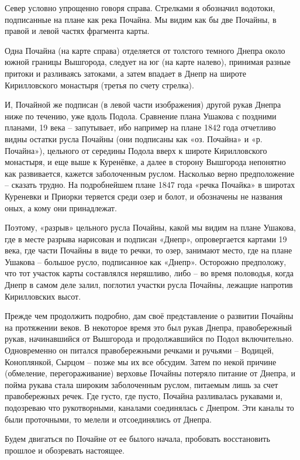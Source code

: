 Север условно упрощенно говоря справа. Стрелками я обозначил водотоки, подписанные на плане как река Почайна. Мы видим как бы две Почайны, в правой и левой частях фрагмента карты.

Одна Почайна (на карте справа) отделяется от толстого темного Днепра около южной границы Вышгорода, следует на юг (на карте налево), принимая разные притоки и разливаясь затоками, а затем впадает в Днепр на широте Кирилловского монастыря (третья по счету стрелка). 

И, Почайной же подписан (в левой части изображения) другой рукав Днепра ниже по течению, уже вдоль Подола. Сравнение плана Ушакова с поздними планами, 19 века – запутывает, ибо например на плане 1842 года отчетливо видны остатки русла Почайны (они подписаны как «оз. Почайна» и «р. Почайна»), цельного от середины Подола вверх к широте Кирилловского монастыря, и еще выше к Куренёвке, а далее в сторону Вышгорода непонятно как развивается, кажется заболоченным руслом. Насколько верно предположение – сказать трудно. На подробнейшем плане 1847 года «речка Почайка» в широтах Куреневки и Приорки теряется среди озер и болот, и обозначены не названия оных, а кому они принадлежат.

Поэтому, «разрыв» цельного русла Почайны, какой мы видим на плане Ушакова, где в месте разрыва нарисован и подписан «Днепр», опровергается картами 19 века, где части Почайны в виде то речки, то озер, занимают место, где на плане Ушакова – большое русло, подписанное как «Днепр». Осторожно предположу, что тот участок карты составлялся неряшливо, либо – во время половодья, когда Днепр в самом деле залил, поглотил участки русла Почайны, лежащие напротив Кирилловских высот.

Прежде чем продолжить подробно, дам своё представление о развитии Почайны на протяжении веков. В некоторое время это был рукав Днепра, правобережный рукав, начинавшийся от Вышгорода и продолжавшийся по Подол включительно. Одновременно он питался правобережными речками и ручьями – Водицей, Коноплянкой, Сырцом – позже мы их все обсудим. Затем по некой причине (обмеление, перегораживание) верховье Почайны потеряло питание от Днепра, и пойма рукава стала широким заболоченным руслом, питаемым лишь за счет правобережных речек. Где густо, где пусто, Почайна разливалась рукавами и, подозреваю что рукотворными, каналами соединялась с Днепром. Эти каналы то были проточными, то мелели и отсоединялись от Днепра.

Будем двигаться по Почайне от ее былого начала, пробовать восстановить прошлое и обозревать настоящее.

